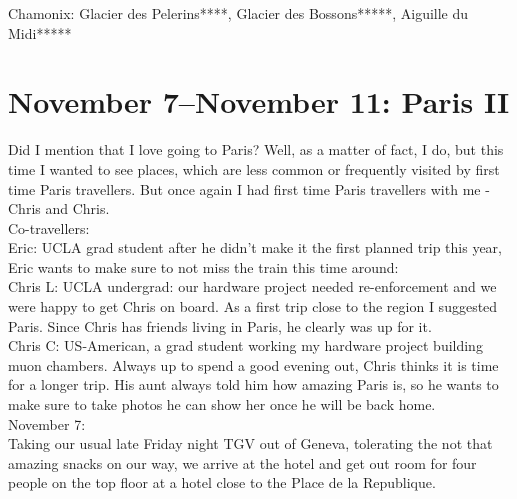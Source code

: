 Chamonix: Glacier des Pelerins****, Glacier des Bossons*****, Aiguille du Midi*****

\section{November 7--November 11: Paris II}
\label{2013ParisII}

Did I mention that I love going to Paris? Well, as a matter of fact, I do, but this time I wanted to see places, which are less common or frequently visited by first time Paris travellers. But once again I had first time Paris travellers with me - Chris and Chris.\\

Co-travellers:\\
Eric: UCLA grad student after he didn't make it the first planned trip this year, Eric wants to make sure to not miss the train this time around:\\
Chris L: UCLA undergrad: our hardware project needed re-enforcement and we were happy to get Chris on board. As a first trip close to the region I suggested Paris. Since Chris has friends living in Paris, he clearly was up for it.\\
Chris C: US-American, a grad student working my hardware project building muon chambers. Always up to spend a good evening out, Chris thinks it is time for a longer trip. His aunt always told him how amazing Paris is, so he wants to make sure to take photos he can show her once he will be back home.\\

November 7:\\
Taking our usual late Friday night TGV out of Geneva, tolerating the not that amazing snacks on our way, we arrive at the hotel and get out room for four people on the top floor at a hotel close to the Place de la Republique.\\

